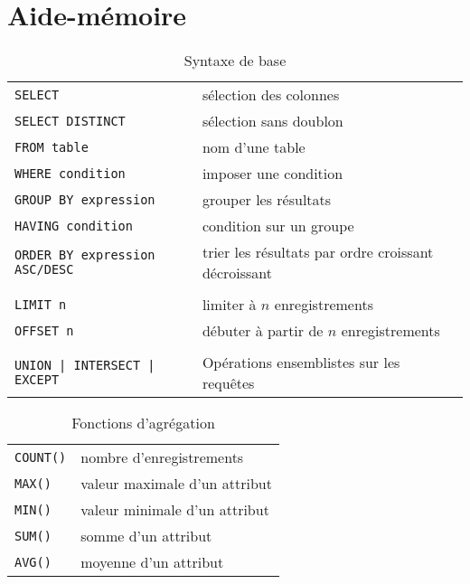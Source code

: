\section{Aide-mémoire}

\begin{table}[h!]
	\centering
	\begin{tabular}{|ll|}
		\hline
		\texttt{SELECT}                       & sélection des colonnes                              \\
		\texttt{SELECT DISTINCT}              & sélection sans doublon                              \\
		\texttt{FROM table}                   & nom d'une table                                     \\
		\texttt{WHERE condition}              & imposer une condition                               \\
		\texttt{GROUP BY expression}          & grouper les résultats                               \\
		\texttt{HAVING condition}             & condition sur un groupe                             \\
		\texttt{ORDER BY expression ASC/DESC} & trier les résultats par ordre croissant décroissant \\
		                                               &                                                     \\
		\texttt{LIMIT n}                      & limiter à $ n $ enregistrements                     \\
		\texttt{OFFSET n}                     & débuter à partir de $ n $ enregistrements           \\
		                                               &                                                     \\
		\texttt{UNION | INTERSECT | EXCEPT}   & Opérations ensemblistes sur les requêtes            \\
		\hline
	\end{tabular}
	\caption{Syntaxe de base}
\end{table}

\begin{table}[h!]
	\centering
	\begin{tabular}{|ll|}
		\hline
		\texttt{COUNT()} & nombre d'enregistrements      \\
		\texttt{MAX()}   & valeur maximale d'un attribut \\
		\texttt{MIN()}   & valeur minimale d'un attribut \\
		\texttt{SUM()}   & somme d'un attribut           \\
		\texttt{AVG()}   & moyenne d'un attribut         \\
		\hline
	\end{tabular}
	\caption{Fonctions d'agrégation}
	\label{tab:agregation-func}
\end{table}


